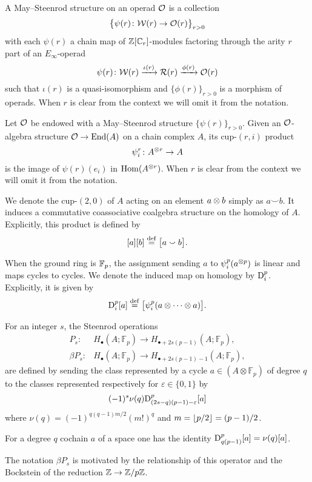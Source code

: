 \sssec

A May--Steenrod structure on an operad $\cO$ is a collection
\[
\set[\big]{\psi(r) \colon \cW(r) \to \cO(r)}_{r>0}
\]
with each $\psi(r)$ a chain map of $\Z[\cyc_r]$-modules factoring through the arity $r$ part of an $E_\infty$-operad
\[
\psi(r) \colon \cW(r) \xra{\iota(r)} \cR(r) \xra{\phi(r)} \cO(r)
\]
such that $\iota(r)$ is a quasi-isomorphism and $\{\phi(r)\}_{r>0}$ is a morphism of operads.
When $r$ is clear from the context we will omit it from the notation.

\sssec

Let $\cO$ be endowed with a May--Steenrod structure $\{\psi(r)\}_{r>0}$.
Given an $\cO$-algebra structure $\cO \to \End(A)$ on a chain complex $A$, its cup-$(r,i)$ product
\[
\psi_i^r \colon A^{\ot r} \to A
\]
is the image of $\psi(r)(e_i)$ in $\Hom(A^{\ot r})$. %
When $r$ is clear from the context we will omit it from the notation.

\sssec

We denote the cup-$(2,0)$ of $A$ acting on an element $a \ot b$ simply as $a \smallsmile b$.
It induces a commutative coassociative coalgebra structure on the homology of $A$.
Explicitly, this product is defined by
\[
[a][b] \defeq \big[a \smallsmile b\big].
\]

\sssec

When the ground ring is $\Fp$, the assignment sending $a$ to $\psi_i^p(a^{\ot p})$ is linear and maps cycles to cycles.
We denote the induced map on homology by $\rD_i^p$.
Explicitly, it is given by
\[
\rD_i^p[a] \defeq \big[\psi_i^p(a \ot\dotsb\ot a)\big].
\]

\sssec

For an integer $s$, the Steenrod operations
\begin{align*}
	P_s \colon& H_\bullet(A; \mathbb{F}_p) \to H_{\bullet + 2s(p-1)}(A; \mathbb{F}_p), \\
	\beta P_s \colon& H_\bullet(A; \mathbb{F}_p) \to H_{\bullet + 2s(p-1) - 1}(A; \mathbb{F}_p),
\end{align*}
are defined by sending the class represented by a cycle $a \in (A \otimes \mathbb{F}_p)$ of degree $q$ to the classes represented respectively for $\varepsilon \in\{0,1\}$ by
\begin{equation*}
	(-1)^s \nu(q) \rD^p_{(2s-q)(p-1)-\varepsilon}[a]
\end{equation*}
where $\nu(q) = (-1)^{q(q-1)m/2}(m!)^q$ and $m = \floor{p/2} = (p-1)/2$.

\begin{remark*}
	For a degree $q$ cochain $a$ of a space one has the identity $\rD_{q(p-1)}^p[a] = \nu(q)[a]$.
\end{remark*}

\begin{remark*}
	The notation $\beta P_s$ is motivated by the relationship of this operator and the Bockstein of the reduction $\Z \to \Z/p\Z$.
\end{remark*}